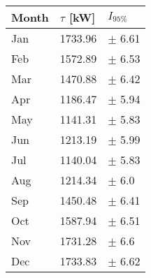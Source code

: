 \begin{tabular}{lll}
\toprule
Month & $\tau$ [kW] &   $I_{95\%}$ \\
\midrule
  Jan &     1733.96 &   $\pm$ 6.61 \\
  Feb &     1572.89 &   $\pm$ 6.53 \\
  Mar &     1470.88 &   $\pm$ 6.42 \\
  Apr &     1186.47 &   $\pm$ 5.94 \\
  May &     1141.31 &   $\pm$ 5.83 \\
  Jun &     1213.19 &   $\pm$ 5.99 \\
  Jul &     1140.04 &   $\pm$ 5.83 \\
  Aug &     1214.34 &    $\pm$ 6.0 \\
  Sep &     1450.48 &   $\pm$ 6.41 \\
  Oct &     1587.94 &   $\pm$ 6.51 \\
  Nov &     1731.28 &    $\pm$ 6.6 \\
  Dec &     1733.83 &   $\pm$ 6.62 \\
\bottomrule
\end{tabular}
